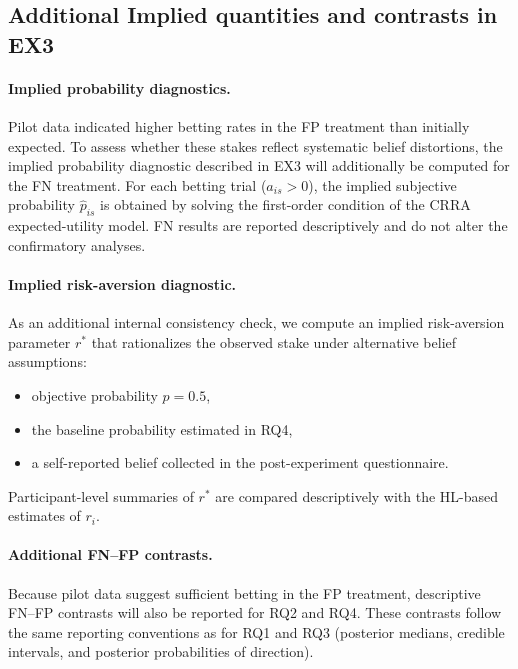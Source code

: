 \documentclass[11pt,a4paper]{article}
\numberwithin{equation}{section}
\begin{document}
\subsection{Additional Implied quantities and contrasts in EX3}

\paragraph{Implied probability diagnostics.}

Pilot data indicated higher betting rates in the FP treatment than
initially expected. To assess whether these stakes reflect systematic
belief distortions, the implied probability diagnostic described in
EX3 will additionally be computed for the FN treatment.
For each betting trial ($a_{is}>0$), the implied subjective probability
$\hat p_{is}$ is obtained by solving the first-order condition of the
CRRA expected-utility model. FN results are reported descriptively and
do not alter the confirmatory analyses.

\paragraph{Implied risk-aversion diagnostic.}

As an additional internal consistency check, we compute an implied
risk-aversion parameter $r^\ast$ that rationalizes the observed stake
under alternative belief assumptions:
\begin{itemize}
	\item objective probability $p=0.5$,
	\item the baseline probability estimated in RQ4,
	\item a self-reported belief collected in the post-experiment questionnaire.
\end{itemize}

Participant-level summaries of $r^\ast$ are compared descriptively
with the HL-based estimates of $r_i$.

\paragraph{Additional FN--FP contrasts.}

Because pilot data suggest sufficient betting in the FP treatment,
descriptive FN--FP contrasts will also be reported for RQ2 and RQ4.
These contrasts follow the same reporting conventions as for RQ1 and RQ3
(posterior medians, credible intervals, and posterior probabilities
of direction).
\end{document}
